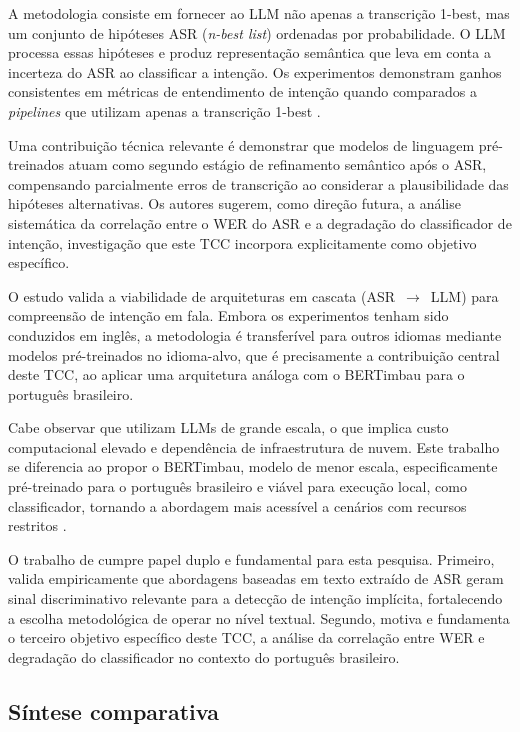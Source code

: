 \documentclass[
    12pt,                %
    openright,           %
    oneside,             %
    a4paper,             %
    english,             %
    brazil               %
]{abntex2}
\begin{document}
A metodologia consiste em fornecer ao LLM não apenas a transcrição 1-best, mas um conjunto de hipóteses ASR (\textit{n-best list}) ordenadas por probabilidade. O LLM processa essas hipóteses e produz representação semântica que leva em conta a incerteza do ASR ao classificar a intenção. Os experimentos demonstram ganhos consistentes em métricas de entendimento de intenção quando comparados a \textit{pipelines} que utilizam apenas a transcrição 1-best \cite{Dighe2024}.

Uma contribuição técnica relevante é demonstrar que modelos de linguagem pré-treinados atuam como segundo estágio de refinamento semântico após o ASR, compensando parcialmente erros de transcrição ao considerar a plausibilidade das hipóteses alternativas. Os autores sugerem, como direção futura, a análise sistemática da correlação entre o WER do ASR e a degradação do classificador de intenção, investigação que este TCC incorpora explicitamente como objetivo específico.

O estudo valida a viabilidade de arquiteturas em cascata (ASR~$\rightarrow$~LLM) para compreensão de intenção em fala. Embora os experimentos tenham sido conduzidos em inglês, a metodologia é transferível para outros idiomas mediante modelos pré-treinados no idioma-alvo, que é precisamente a contribuição central deste TCC, ao aplicar uma arquitetura análoga com o BERTimbau \cite{Souza2020} para o português brasileiro.

Cabe observar que  utilizam LLMs de grande escala, o que implica custo computacional elevado e dependência de infraestrutura de nuvem. Este trabalho se diferencia ao propor o BERTimbau, modelo de menor escala, especificamente pré-treinado para o português brasileiro e viável para execução local, como classificador, tornando a abordagem mais acessível a cenários com recursos restritos \cite{Souza2020, Xu2024}.

O trabalho de  cumpre papel duplo e fundamental para esta pesquisa. Primeiro, valida empiricamente que abordagens baseadas em texto extraído de ASR geram sinal discriminativo relevante para a detecção de intenção implícita, fortalecendo a escolha metodológica de operar no nível textual. Segundo, motiva e fundamenta o terceiro objetivo específico deste TCC, a análise da correlação entre WER e degradação do classificador no contexto do português brasileiro.


\subsection{Síntese comparativa}
\label{sec:sintese_comparativa}
\end{document}
